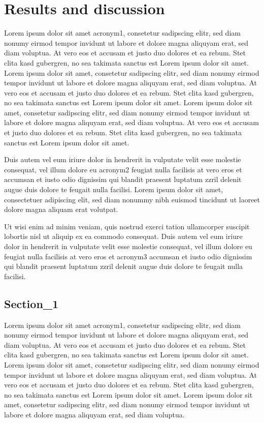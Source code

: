 \chapter{Results and discussion}

Lorem ipsum dolor sit amet \acrfull{acronym1}, consetetur sadipscing elitr, sed diam nonumy eirmod tempor invidunt ut labore et dolore magna aliquyam erat, sed diam voluptua. At vero eos et accusam et justo duo dolores et ea rebum. Stet clita kasd gubergren, no sea takimata sanctus est Lorem ipsum dolor sit amet. Lorem ipsum dolor sit amet, consetetur sadipscing elitr, sed diam nonumy eirmod tempor invidunt ut labore et dolore magna aliquyam erat, sed diam voluptua. At vero eos et accusam et justo duo dolores et ea rebum. Stet clita kasd gubergren, no sea takimata sanctus est Lorem ipsum dolor sit amet. Lorem ipsum dolor sit amet, consetetur sadipscing elitr, sed diam nonumy eirmod tempor invidunt ut labore et dolore magna aliquyam erat, sed diam voluptua. At vero eos et accusam et justo duo dolores et ea rebum. Stet clita kasd gubergren, no sea takimata sanctus est Lorem ipsum dolor sit amet. 

Duis autem vel eum iriure dolor in hendrerit in vulputate velit esse molestie consequat, vel illum dolore eu \acrfull{acronym2} feugiat nulla facilisis at vero eros et accumsan et iusto odio dignissim qui blandit praesent luptatum zzril delenit augue duis dolore te feugait nulla facilisi. Lorem ipsum dolor sit amet, consectetuer adipiscing elit, sed diam nonummy nibh euismod tincidunt ut laoreet dolore magna aliquam erat volutpat. 

Ut wisi enim ad minim veniam, quis nostrud exerci tation ullamcorper suscipit lobortis nisl ut aliquip ex ea commodo consequat. Duis autem vel eum iriure dolor in hendrerit in vulputate velit esse molestie consequat, vel illum dolore eu feugiat nulla facilisis at vero eros et \acrfull{acronym3} accumsan et iusto odio dignissim qui blandit praesent luptatum zzril delenit augue duis dolore te feugait nulla facilisi.

\section{Section\_1}

Lorem ipsum dolor sit amet \acrfull{acronym1}, consetetur sadipscing elitr, sed diam nonumy eirmod tempor invidunt ut labore et dolore magna aliquyam erat, sed diam voluptua. At vero eos et accusam et justo duo dolores et ea rebum. Stet clita kasd gubergren, no sea takimata sanctus est Lorem ipsum dolor sit amet. Lorem ipsum dolor sit amet, consetetur sadipscing elitr, sed diam nonumy eirmod tempor invidunt ut labore et dolore magna aliquyam erat, sed diam voluptua. At vero eos et accusam et justo duo dolores et ea rebum. Stet clita kasd gubergren, no sea takimata sanctus est Lorem ipsum dolor sit amet. Lorem ipsum dolor sit amet, consetetur sadipscing elitr, sed diam nonumy eirmod tempor invidunt ut labore et dolore magna aliquyam erat, sed diam voluptua.

